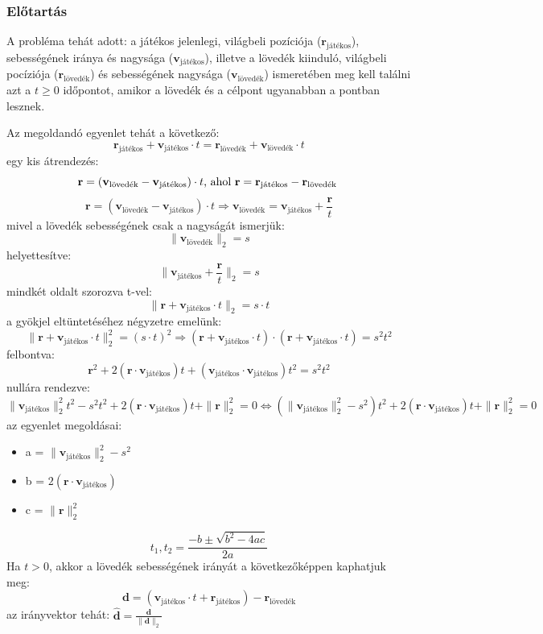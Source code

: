 \documentclass[12pt]{report}
\begin{document}
\subsubsection{Előtartás}
A probléma tehát adott: a játékos jelenlegi, világbeli pozíciója (\(\mathbf{r}_{\text{játékos}}\)), sebességének iránya és nagysága (\(\mathbf{v}_{\text{játékos}}\)), illetve a lövedék kiinduló, világbeli pocíziója (\(\mathbf{r}_{\text{lövedék}}\)) és sebességének nagysága (\(\mathbf{v}_{\text{lövedék}}\)) ismeretében meg kell találni azt a $t \ge 0$ időpontot, amikor a lövedék és a célpont ugyanabban a pontban lesznek.

\newpage
\noindent Az megoldandó egyenlet tehát a következő:
\[
\mathbf{r}_{\text{játékos}} + \mathbf{v}_{\text{játékos}} \cdot t = \mathbf{r}_{\text{lövedék}} + \mathbf{v}_{\text{lövedék}} \cdot t
\]
egy kis átrendezés:
\[
\noindent\makebox[\textwidth]{%
    $\mathbf{r} = (\mathbf{v}_{\text{lövedék}} - \mathbf{v}_{\text{játékos}}) \cdot t$, ahol $\mathbf{r} = \mathbf{r}_{\text{játékos}} - \mathbf{r}_{\text{lövedék}}$
}
\]
\[
    \mathbf{r} = (\mathbf{v}_{\text{lövedék}} - \mathbf{v}_{\text{játékos}}) \cdot t \Rightarrow \mathbf{v}_{\text{lövedék}} = \mathbf{v}_{\text{játékos}} + \frac{\mathbf{r}}{t}
\]
mivel a lövedék sebességének csak a nagyságát ismerjük:
\[
    \|\mathbf{v}_{\text{lövedék}}\|_2 = s
\]
helyettesítve:
\[
    \|\mathbf{v}_{\text{játékos}} + \frac{\mathbf{r}}{t}\|_2 = s
\]
mindkét oldalt szorozva t-vel:
\[
    \|\mathbf{r} + \mathbf{v}_{\text{játékos}} \cdot t\|_2 = s \cdot t
\]
a gyökjel eltüntetéséhez négyzetre emelünk:
\[
    \|\mathbf{r} + \mathbf{v}_{\text{játékos}} \cdot t\|_2^2 = (s \cdot t)^2 \Rightarrow (\mathbf{r} + \mathbf{v}_{\text{játékos}} \cdot t) \cdot (\mathbf{r} + \mathbf{v}_{\text{játékos}} \cdot t) = s^2t^2
\]
felbontva:
\[
    \mathbf{r}^2 + 2(\mathbf{r} \cdot \mathbf{v}_{\text{játékos}})t + (\mathbf{v}_{\text{játékos}} \cdot \mathbf{v}_{\text{játékos}})t^2 = s^2t^2
\]
nullára rendezve:
\[
    \|\mathbf{v}_{\text{játékos}}\|_2^2t^2 - s^2t^2 + 2(\mathbf{r} \cdot \mathbf{v}_{\text{játékos}})t + \|\mathbf{r}\|_2^2 = 0
    \Leftrightarrow
    (\|\mathbf{v}_{\text{játékos}}\|_2^2 - s^2)t^2 + 2(\mathbf{r} \cdot \mathbf{v}_{\text{játékos}})t + \|\mathbf{r}\|_2^2 = 0
\]
az egyenlet megoldásai:
\begin{itemize}
    \item a = $\|\mathbf{v}_{\text{játékos}}\|_2^2 - s^2$
    \item b = $2(\mathbf{r} \cdot \mathbf{v}_{\text{játékos}})$
    \item c = $\|\mathbf{r}\|_2^2$
\end{itemize}
\[
    t_{1}, t_{2} = \frac{-b \pm \sqrt{b^2 - 4ac}}{2a}
\]
Ha $t > 0$, akkor a lövedék sebességének irányát a következőképpen kaphatjuk meg:
\[
    \mathbf{d} = (\mathbf{v}_{\text{játékos}} \cdot t + \mathbf{r}_{\text{játékos}}) - \mathbf{r}_{\text{lövedék}}
\]
az irányvektor tehát: $\hat{\mathbf{d}} = \frac{\mathbf{d}}{\|\mathbf{d}\|_2}$
\end{document}

